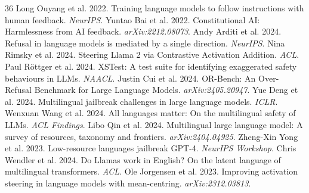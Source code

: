 \documentclass[11pt,a4paper]{article}
\begin{document}
\begin{thebibliography}{36}
 Long Ouyang et al. 2022. Training language models to follow instructions with human feedback. \emph{NeurIPS}.
 Yuntao Bai et al. 2022. Constitutional AI: Harmlessness from AI feedback. \emph{arXiv:2212.08073}.
 Andy Arditi et al. 2024. Refusal in language models is mediated by a single direction. \emph{NeurIPS}.
 Nina Rimsky et al. 2024. Steering Llama 2 via Contrastive Activation Addition. \emph{ACL}.
 Paul R{\"o}ttger et al. 2024. XSTest: A test suite for identifying exaggerated safety behaviours in LLMs. \emph{NAACL}.
 Justin Cui et al. 2024. OR-Bench: An Over-Refusal Benchmark for Large Language Models. \emph{arXiv:2405.20947}.
 Yue Deng et al. 2024. Multilingual jailbreak challenges in large language models. \emph{ICLR}.
 Wenxuan Wang et al. 2024. All languages matter: On the multilingual safety of LLMs. \emph{ACL Findings}.
 Libo Qin et al. 2024. Multilingual large language model: A survey of resources, taxonomy and frontiers. \emph{arXiv:2404.04925}.
 Zheng-Xin Yong et al. 2023. Low-resource languages jailbreak GPT-4. \emph{NeurIPS Workshop}.
 Chris Wendler et al. 2024. Do Llamas work in English? On the latent language of multilingual transformers. \emph{ACL}.
 Ole Jorgensen et al. 2023. Improving activation steering in language models with mean-centring. \emph{arXiv:2312.03813}.
\end{thebibliography}
\end{document}
